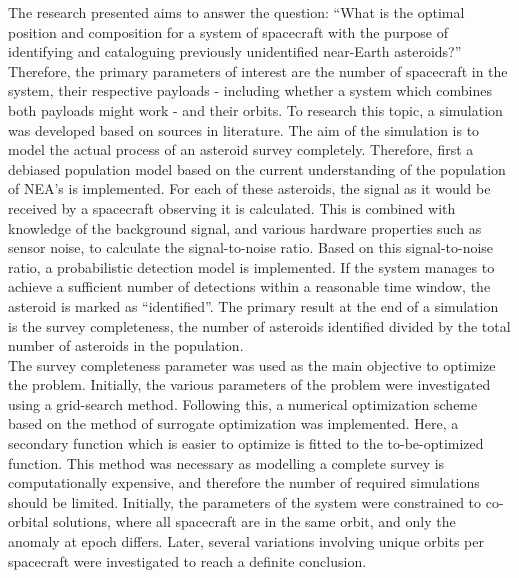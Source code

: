 The research presented aims to answer the question: ``What is the optimal position and composition for a system of spacecraft with the purpose of identifying and cataloguing previously unidentified near-Earth asteroids?'' Therefore, the primary parameters of interest are the number of spacecraft in the system, their respective payloads - including whether a system which combines both payloads might work - and their orbits. To research this topic, a simulation was developed based on sources in literature. The aim of the simulation is to model the actual process of an asteroid survey completely. Therefore, first a debiased population model based on the current understanding of the population of NEA's is implemented. For each of these asteroids, the signal as it would be received by a spacecraft observing it is calculated. This is combined with knowledge of the background signal, and various hardware properties such as sensor noise, to calculate the signal-to-noise ratio. Based on this signal-to-noise ratio, a probabilistic detection model is implemented. If the system manages to achieve a sufficient number of detections within a reasonable time window, the asteroid is marked as ``identified''. The primary result at the end of a simulation is the survey completeness, the number of asteroids identified divided by the total number of asteroids in the population. \\

The survey completeness parameter was used as the main objective to optimize the problem. Initially, the various parameters of the problem were investigated using a grid-search method. Following this, a numerical optimization scheme based on the method of surrogate optimization was implemented. Here, a secondary function which is easier to optimize is fitted to the to-be-optimized function. This method was necessary as modelling a complete survey is computationally expensive, and therefore the number of required simulations should be limited. Initially, the parameters of the system were constrained to co-orbital solutions, where all spacecraft are in the same orbit, and only the anomaly at epoch differs. Later, several variations involving unique orbits per spacecraft were investigated to reach a definite conclusion. \\

